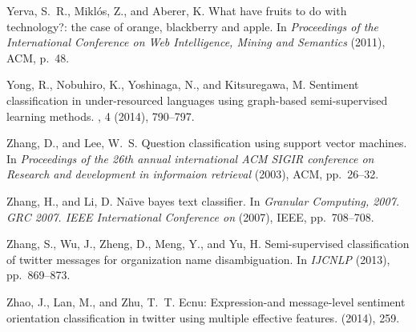 \documentclass[10pt,letterpaper]{article}
\begin{document}
\begin{thebibliography}{10}
{\sc Yerva, S.~R., Mikl{\'o}s, Z., and Aberer, K.}
\newblock What have fruits to do with technology?: the case of orange,
  blackberry and apple.
\newblock In {\em Proceedings of the International Conference on Web
  Intelligence, Mining and Semantics\/} (2011), ACM, p.~48.

{\sc Yong, R., Nobuhiro, K., Yoshinaga, N., and Kitsuregawa, M.}
\newblock Sentiment classification in under-resourced languages using
  graph-based semi-supervised learning methods.
, 4 (2014),
  790--797.

{\sc Zhang, D., and Lee, W.~S.}
\newblock Question classification using support vector machines.
\newblock In {\em Proceedings of the 26th annual international ACM SIGIR
  conference on Research and development in informaion retrieval\/} (2003),
  ACM, pp.~26--32.

{\sc Zhang, H., and Li, D.}
\newblock Na{\"\i}ve bayes text classifier.
\newblock In {\em Granular Computing, 2007. GRC 2007. IEEE International
  Conference on\/} (2007), IEEE, pp.~708--708.

{\sc Zhang, S., Wu, J., Zheng, D., Meng, Y., and Yu, H.}
\newblock Semi-supervised classification of twitter messages for organization
  name disambiguation.
\newblock In {\em IJCNLP\/} (2013), pp.~869--873.

{\sc Zhao, J., Lan, M., and Zhu, T.~T.}
\newblock Ecnu: Expression-and message-level sentiment orientation
  classification in twitter using multiple effective features.
 (2014), 259.

\end{thebibliography}

%
\end{document}
